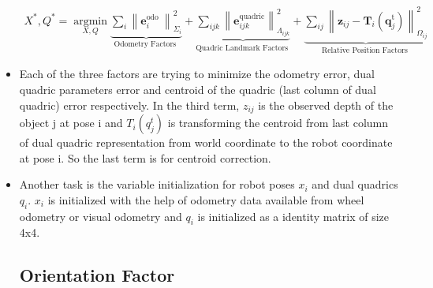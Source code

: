\documentclass{article}
\begin{document}
\begin{itemize}
\begin{equation}
{
\begin{aligned}
X^{*}, Q^{*} =\underset{X, Q}{\operatorname{argmin}} \underbrace{\sum_{i}\left\|\mathbf{e}_{i}^{\text {odo }}\right\|_{\Sigma_{i}}^{2}}_{\text {Odometry Factors }}+\underbrace{\sum_{i j k}\left\|\mathbf{e}_{i j k}^{\mathrm{quadric}}\right\|_{\Lambda_{i j k}}^{2}}_{\text {Quadric Landmark Factors }}+\underbrace{\sum_{i j}\left\|\mathbf{z}_{i j}-\mathbf{T}_{i}\left(\mathbf{q}_{j}^{\mathrm{t}}\right)\right\|_{\Omega_{i j}}^{2}}_{\text {Relative Position Factors }}
\end{aligned}
}
\end{equation}
\item Each of the three factors are trying to minimize the odometry error, dual quadric parameters error and centroid of the quadric (last column of dual quadric) error respectively. In the third term, $z_{ij}$ is the observed depth of the object j at pose i and $T_i(q_{j}^{t})$ is transforming the centroid from last column of dual quadric representation from world coordinate to the robot coordinate at pose i. So the last term is for centroid correction.

\item Another task is the variable initialization for robot poses $x_i$ and dual quadrics $q_i$. $x_i$ is initialized with the help of odometry data available from wheel odometry or visual odometry and $q_i$ is initialized as a identity matrix of size 4x4.


\subsection{Orientation Factor}


\end{itemize}
\end{document}
